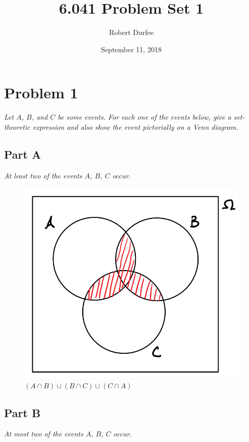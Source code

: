 \documentclass{article}
\title{6.041 Problem Set 1}
\author{Robert Durfee}
\date{September 11, 2018}
\begin{document}
\maketitle

\section*{Problem 1}

\textit{Let $ A $, $ B $, and $ C $ be some events. For each one of the events
below, give a set-theoretic expression and also show the event pictorially on a
Venn diagram.}

\subsection*{Part A}

\textit{At least two of the events $ A $, $ B $, $ C $ occur.}

\begin{figure}[H]
    \centering
    \includegraphics[scale=0.5]{"P1A"}
    \caption{ $ (A \cap B) \cup (B \cap C) \cup (C \cap A) $ }
\end{figure}

\subsection*{Part B}

\textit{At most two of the events $ A $, $ B $, $ C $ occur.}
\end{document}
